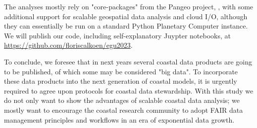 \documentclass[11pt,twoside,a4paper]{article}
\begin{document}
{  The analyses mostly rely on "core-packages" from the Pangeo project,
  \parencite{hammanPangeoBigdataEcosystem2018}, with some additional support for
  scalable geospatial data analysis and cloud I/O, although they can essentially be run
  on a standard Python Planetary Computer instance. We will publish our code, including
  self-explanatory Juypter notebooks, at \url{https://github.com/floriscalkoen/egu2023}.

  To conclude, we foresee that in next years several coastal data products are going to
  be published, of which some may be considered "big data". To incorporate these data
  products into the next generation of coastal models, it is urgently required to agree
  upon protocols for coastal data stewardship. With this study we do not only want to
  show the advantages of scalable coastal data analysis; we mostly want to encourage the
  coastal research community to adopt FAIR data management principles
  \parencite{wilkinsonFAIRGuidingPrinciples2016} and workflows in an era of exponential
  data growth.}

\printbibliography
\end{document}
